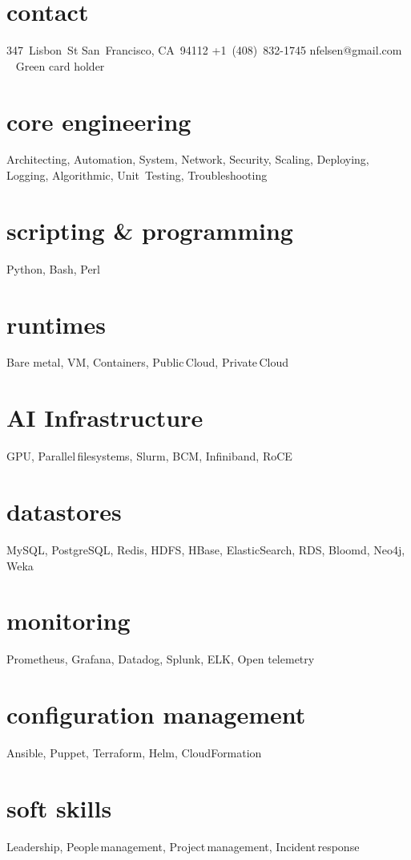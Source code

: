 \documentclass[]{cv-style}          %
\begin{document}
\usepackage[papersize={8.5in,11in}]{geometry}

\lastupdated


\begin{aside}
%
\section{contact}
347~Lisbon~St
San~Francisco, CA~94112
+1~(408)~832-1745
nfelsen@gmail.com
~
Green card holder
%
\section{core engineering}
Architecting, Automation, System, Network, Security, Scaling, Deploying, Logging, Algorithmic, Unit~Testing, Troubleshooting
\section{scripting \& programming}
Python, Bash, Perl
\section{runtimes}
Bare metal, VM, Containers, Public\,Cloud, Private\,Cloud
\section{AI Infrastructure}
GPU, Parallel\,filesystems, Slurm, BCM, Infiniband, RoCE
\section{datastores}
MySQL, PostgreSQL, Redis, HDFS, HBase, ElasticSearch, RDS, Bloomd, Neo4j, Weka
\section{monitoring}
Prometheus, Grafana, Datadog, Splunk, ELK, Open telemetry
\section{configuration management}
Ansible, Puppet, Terraform, Helm, CloudFormation
\section{soft skills}
Leadership, People\,management, Project\,management, Incident\,response
%
\end{aside}
\end{document}

